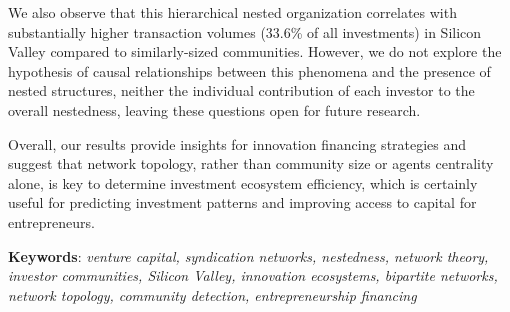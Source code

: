 We also observe that this hierarchical nested organization correlates with substantially higher transaction volumes (33.6\% of all investments) in Silicon Valley compared to similarly-sized communities. However, we do not explore the hypothesis of causal relationships between this phenomena and the presence of nested structures, neither the individual contribution of each investor to the overall nestedness, leaving these questions open for future research.

Overall, our results provide insights for innovation financing strategies and suggest that network topology, rather than community size or agents centrality alone, is key to determine investment ecosystem efficiency, which is certainly useful for predicting investment patterns and improving access to capital for entrepreneurs.

\vspace{\fill}

\textbf{Keywords}: \textit{venture capital, syndication networks, nestedness, network theory, investor communities, Silicon Valley, innovation ecosystems, bipartite networks, network topology, community detection, entrepreneurship financing}

\pagebreak